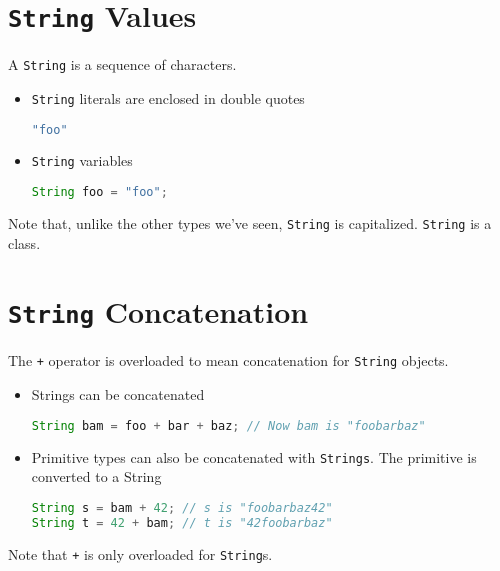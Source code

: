 \documentclass{article}
\begin{document}
\section{{\tt String} Values}


A {\tt String} is a sequence of characters.
\begin{itemize}

\item {\tt String} literals are enclosed in double quotes
\begin{lstlisting}[language=Java]
"foo"
\end{lstlisting}

\item {\tt String} variables

\begin{lstlisting}[language=Java]
String foo = "foo";
\end{lstlisting}

\end{itemize}

Note that, unlike the other types we've seen, {\tt String} is capitalized.  {\tt String} is a class.





\section{{\tt String} Concatenation }


The {\tt +} operator is overloaded to mean concatenation for {\tt String} objects.

\begin{itemize}

\item Strings can be concatenated
\begin{lstlisting}[language=Java]
String bam = foo + bar + baz; // Now bam is "foobarbaz"
\end{lstlisting}

\item Primitive types can also be concatenated with {\tt Strings}.  The primitive is converted to a String
\begin{lstlisting}[language=Java]
String s = bam + 42; // s is "foobarbaz42"
String t = 42 + bam; // t is "42foobarbaz"
\end{lstlisting}

\end{itemize}

Note that {\tt +} is only overloaded for {\tt String}s.
\end{document}
